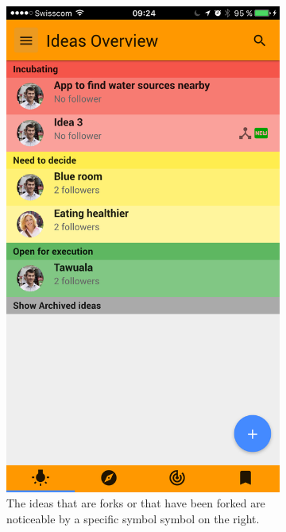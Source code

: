 \documentclass[a4paper,12pt, oneside]{article}
\begin{document}
\begin{figure}[!htb]
    \centering
    \begin{subfigure}[t]{.32\textwidth}
        \includegraphics[width=\textwidth]{images/forks_ideasOverview.png}
        \caption{The ideas that are forks or that have been forked are noticeable by a specific symbol symbol on the right.}
    \end{subfigure}
    \hfill
    \begin{subfigure}[t]{.32\textwidth}

\end{subfigure}
\end{figure}
\end{document}
